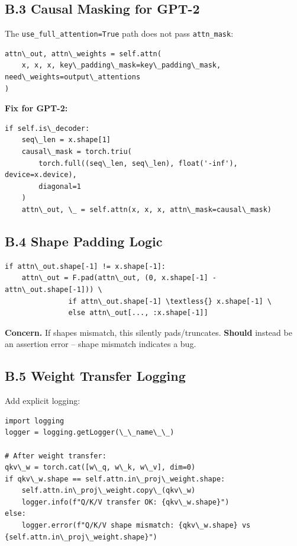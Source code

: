 \subsection{B.3 Causal Masking for GPT-2}

The \texttt{use\_full\_attention=True} path does not pass \texttt{attn\_mask}:

\begin{lstlisting}
attn\_out, attn\_weights = self.attn(
    x, x, x, key\_padding\_mask=key\_padding\_mask, need\_weights=output\_attentions
)
\end{lstlisting}

\textbf{Fix for GPT-2:}

\begin{lstlisting}
if self.is\_decoder:
    seq\_len = x.shape[1]
    causal\_mask = torch.triu(
        torch.full((seq\_len, seq\_len), float('-inf'), device=x.device),
        diagonal=1
    )
    attn\_out, \_ = self.attn(x, x, x, attn\_mask=causal\_mask)
\end{lstlisting}

\subsection{B.4 Shape Padding Logic}

\begin{lstlisting}
if attn\_out.shape[-1] != x.shape[-1]:
    attn\_out = F.pad(attn\_out, (0, x.shape[-1] - attn\_out.shape[-1])) \
               if attn\_out.shape[-1] \textless{} x.shape[-1] \
               else attn\_out[..., :x.shape[-1]]
\end{lstlisting}

\textbf{Concern.} If shapes mismatch, this silently pads/truncates. \textbf{Should} 
instead be an assertion error -- shape mismatch indicates a bug.

\subsection{B.5 Weight Transfer Logging}

Add explicit logging:

\begin{lstlisting}
import logging
logger = logging.getLogger(\_\_name\_\_)

# After weight transfer:
qkv\_w = torch.cat([w\_q, w\_k, w\_v], dim=0)
if qkv\_w.shape == self.attn.in\_proj\_weight.shape:
    self.attn.in\_proj\_weight.copy\_(qkv\_w)
    logger.info(f"Q/K/V transfer OK: {qkv\_w.shape}")
else:
    logger.error(f"Q/K/V shape mismatch: {qkv\_w.shape} vs {self.attn.in\_proj\_weight.shape}")
\end{lstlisting}

